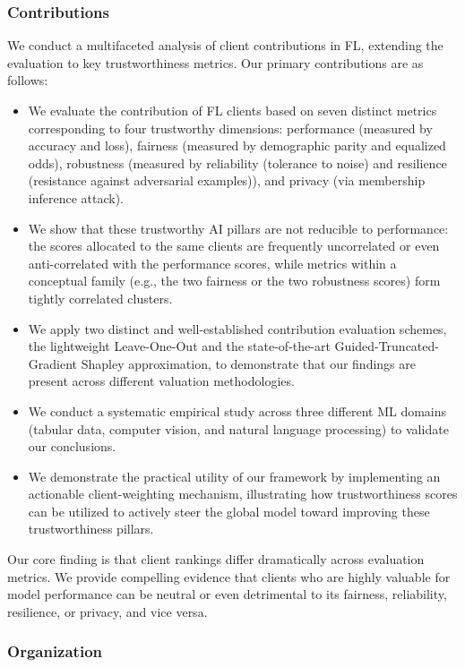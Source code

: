 \documentclass[acmsmall]{acmart}
\begin{document}
\subsubsection*{Contributions}

We conduct a multifaceted analysis of client contributions in FL, extending the evaluation to key trustworthiness metrics. Our primary contributions are as follows:

\begin{itemize}
    \item We evaluate the contribution of FL clients based on seven distinct metrics corresponding to four trustworthy dimensions: performance (measured by accuracy and loss), fairness (measured by demographic parity and equalized odds), robustness (measured by reliability (tolerance to noise) and resilience (resistance against adversarial examples)), and privacy (via membership inference attack).
    \item We show that these trustworthy AI pillars are not reducible to performance: the scores allocated to the same clients are frequently uncorrelated or even anti-correlated with the performance scores, while metrics within a conceptual family (e.g., the two fairness or the two robustness scores) form tightly correlated clusters.
    \item We apply two distinct and well-established contribution evaluation schemes, the lightweight Leave-One-Out and the state-of-the-art Guided-Truncated-Gradient Shapley approximation, to demonstrate that our findings are present across different valuation methodologies.
    \item We conduct a systematic empirical study across three different ML domains (tabular data, computer vision, and natural language processing) to validate our conclusions.
    \item We demonstrate the practical utility of our framework by implementing an actionable client-weighting mechanism, illustrating how trustworthiness scores can be utilized to actively steer the global model toward improving these trustworthiness pillars. 
\end{itemize}

Our core finding is that client rankings differ dramatically across evaluation metrics. We provide compelling evidence that clients who are highly valuable for model performance can be neutral or even detrimental to its fairness, reliability, resilience, or privacy, and vice versa. 

\subsubsection*{Organization}
\end{document}
